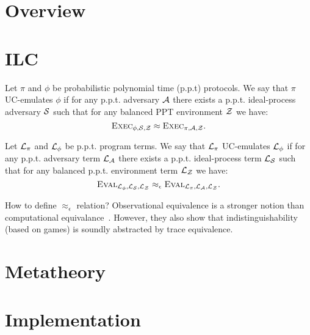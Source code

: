 \documentclass[acmsmall,review,anonymous]{acmart}\settopmatter{printfolios=true,printccs=false,printacmref=false}
\begin{document}
\section{Overview}\label{sec:overview}

\section{ILC}\label{sec:ilc}

\begin{definition}
Let $\pi$ and $\phi$ be probabilistic polynomial time (p.p.t) protocols. We say
that $\pi$ UC-emulates $\phi$ if for any p.p.t. adversary $\mathcal{A}$ there exists a
p.p.t. ideal-process adversary $\mathcal{S}$ such that for any balanced PPT environment
$\mathcal{Z}$ we have:
\begin{equation*}
\textsc{Exec}_{\phi, \mathcal{S}, \mathcal{Z}} \approx \textsc{Exec}_{\pi, \mathcal{A}, \mathcal{Z}}.
\end{equation*}
\end{definition}

\begin{definition}
Let $\mathcal{L}_{\pi}$ and $\mathcal{L}_{\phi}$ be p.p.t. program terms. We say that
$\mathcal{L}_{\pi}$ UC-emulates $\mathcal{L}_{\phi}$ if for any p.p.t. adversary term
$\mathcal{L}_{\mathcal{A}}$ there exists a p.p.t. ideal-process term $\mathcal{L}_{\mathcal{S}}$
such that for any balanced p.p.t. environment term $\mathcal{L}_{\mathcal{Z}}$ we have:
\begin{equation*}
\textsc{Eval}_{\mathcal{L}_{\phi}, \mathcal{L}_{\mathcal{S}}, \mathcal{L}_{\mathcal{Z}}} \approx_{\epsilon} \textsc{Eval}_{\mathcal{L}_{\pi}, \mathcal{L}_{\mathcal{A}}, \mathcal{L}_{\mathcal{Z}}}.
\end{equation*}
\end{definition}

How to define $\approx_{\epsilon}$ relation? Observational equivalence is a
stronger notion than computational
equivalance~\cite{comon2008computational}. However, they also show that
indistinguishability (based on games) is soundly abstracted by trace
equivalence.

\section{Metatheory}\label{sec:metatheory}

\section{Implementation}\label{sec:implementation}
\end{document}
